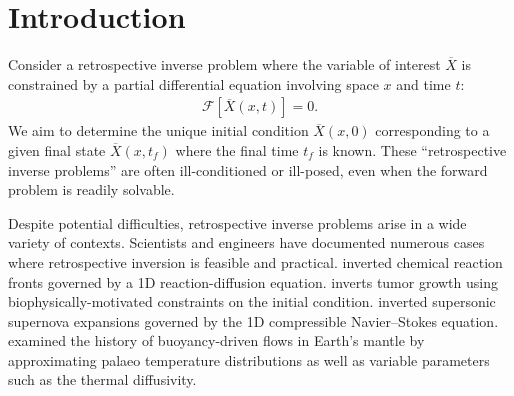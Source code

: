 \documentclass[%
 reprint,
 amsmath,amssymb,
 aps,
 pre,
]{revtex4-2}
\begin{document}
\maketitle

\section{Introduction}\label{secintro}

Consider a retrospective inverse problem where the variable of interest $\overline{X}$ is constrained by a partial differential equation involving space $x$ and time $t$:
\begin{align}
  \mathcal{F}[\overline{X}(x, t)] = 0 \label{genintro}.
\end{align}
We aim to determine the unique initial condition $\overline{X}(x, 0)$ corresponding to a given final state $\overline{X}(x, t_f)$ where the final time $t_f$ is known.
These ``retrospective inverse problems'' are often ill-conditioned or ill-posed, even when the forward problem is readily solvable.

Despite potential difficulties, retrospective inverse problems arise in a wide variety of contexts.
Scientists and engineers have documented numerous cases where retrospective inversion is feasible and practical.
\cite{Lukyanenko2021} inverted chemical reaction fronts governed by a 1D reaction-diffusion equation.
\cite{Subramanian2020} inverts tumor growth using biophysically-motivated constraints on the initial condition.
\cite{Kabanikhin2020} inverted supersonic supernova expansions governed by the 1D compressible Navier--Stokes equation.
\cite{Liu2008, Li2017} examined the history of buoyancy-driven flows in Earth's mantle by approximating palaeo temperature distributions as well as variable parameters such as the thermal diffusivity.
\end{document}
